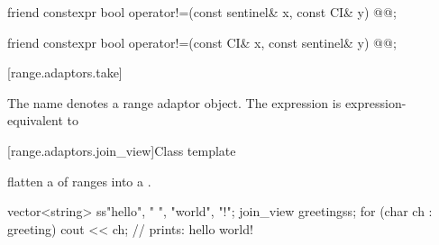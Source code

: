 %
\begin{itemdecl}
friend constexpr bool operator!=(const sentinel& x, const CI& y)
  @@;
\end{itemdecl}

\begin{itemdescr}
\pnum
\oldtxt{\returns} 
\end{itemdescr}

\begin{itemdecl}
friend constexpr bool operator!=(const CI& x, const sentinel& y)
  @@;
\end{itemdecl}

\begin{itemdescr}
\pnum
\oldtxt{\returns} 
\end{itemdescr}

[range.adaptors.take]{}

\pnum
The name  denotes a range adaptor
object.  The
expression   is expression-equivalent to 


[range.adaptors.join_view]{Class template }

\pnum
{}   flatten a
 of ranges into a
.

\pnum
\begin{example}
\begin{codeblock}
vector<string> ss{"hello", " ", "world", "!"};
join_view greeting{ss};
for (char ch : greeting)
  cout << ch; // prints: hello world!
\end{codeblock}
\end{example}

